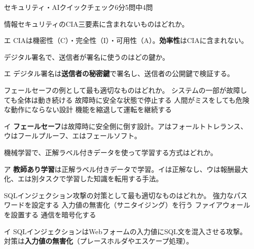 \begin{timeattack}{セキュリティ・AIクイックチェック}{6分}{5問中4問}

\begin{itpmon}[\diffbadge{基}]{情報セキュリティのCIA三要素に含まれないものはどれか。}
\end{itpmon}
\begin{kaisetsu}{エ}
CIAは機密性（C）・完全性（I）・可用性（A）。\textbf{効率性}はCIAに含まれない。
\end{kaisetsu}

\begin{itpmon}[\diffbadge{標}]{デジタル署名で、送信者が署名に使うのはどの鍵か。}
\end{itpmon}
\begin{kaisetsu}{エ}
デジタル署名は\textbf{送信者の秘密鍵}で署名し、送信者の公開鍵で検証する。
\end{kaisetsu}

\begin{itpmon}[\diffbadge{基}]{フェールセーフの例として最も適切なものはどれか。}
\sentakushi
  {システムの一部が故障しても全体は動き続ける}
  {故障時に安全な状態で停止する}
  {人間がミスをしても危険な動作にならない設計}
  {機能を縮退して運転を継続する}
\end{itpmon}
\begin{kaisetsu}{イ}
\textbf{フェールセーフ}は故障時に安全側に倒す設計。アはフォールトトレランス、ウはフールプルーフ、エはフェールソフト。
\end{kaisetsu}

\begin{itpmon}[\diffbadge{標}]{機械学習で、正解ラベル付きデータを使って学習する方式はどれか。}
\end{itpmon}
\begin{kaisetsu}{ア}
\textbf{教師あり学習}は正解ラベル付きデータで学習。イは正解なし、ウは報酬最大化、エは別タスクで学習した知識を転用する手法。
\end{kaisetsu}

\begin{itpmon}[\diffbadge{標}]{SQLインジェクション攻撃の対策として最も適切なものはどれか。}
\sentakushi
  {強力なパスワードを設定する}
  {入力値の無害化（サニタイジング）を行う}
  {ファイアウォールを設置する}
  {通信を暗号化する}
\end{itpmon}
\begin{kaisetsu}{イ}
SQLインジェクションはWebフォームの入力値にSQL文を混入させる攻撃。対策は\textbf{入力値の無害化}（プレースホルダやエスケープ処理）。
\end{kaisetsu}

\end{timeattack}

